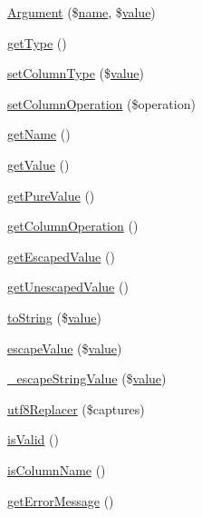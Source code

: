 \begin{DoxyCompactItemize}
\item 
\hyperlink{classArgument_aa9089313bf5ad3d10939dc1e70ee84fe}{Argument} (\$\hyperlink{common_8js_a22c29d2aa8ed6161ce8faa718ef76e68}{name}, \$\hyperlink{jquery_8js_abe5393d870043cf6aaa1d5ad5fce755c}{value})
\item 
\hyperlink{classArgument_a62ea3d6e7689c8a40f6f9722e76fa7a8}{get\+Type} ()
\item 
\hyperlink{classArgument_a849c6abe0d16f2fdf21c38db6844bd9d}{set\+Column\+Type} (\$\hyperlink{jquery_8js_abe5393d870043cf6aaa1d5ad5fce755c}{value})
\item 
\hyperlink{classArgument_a3e737e0b4af5559f56b35c7c1b1b4f2a}{set\+Column\+Operation} (\$operation)
\item 
\hyperlink{classArgument_a592176260424f46cf1b83bf2eb14014e}{get\+Name} ()
\item 
\hyperlink{classArgument_a53b70d0071096047437015737d5d7728}{get\+Value} ()
\item 
\hyperlink{classArgument_a54140067b590d8ce8dcd7d09f56519cd}{get\+Pure\+Value} ()
\item 
\hyperlink{classArgument_a8720ec6d3b4cccdb6dfdd072bb77c9d3}{get\+Column\+Operation} ()
\item 
\hyperlink{classArgument_a02ee73fa63dd2cd754412f176dae54da}{get\+Escaped\+Value} ()
\item 
\hyperlink{classArgument_a45a70c173c816e9cf2c7c5f396a92a6f}{get\+Unescaped\+Value} ()
\item 
\hyperlink{classArgument_a6fa3a8b473d05a02c7746a143e51ef81}{to\+String} (\$\hyperlink{jquery_8js_abe5393d870043cf6aaa1d5ad5fce755c}{value})
\item 
\hyperlink{classArgument_a217bae48930e0208210aa7030a2f2b27}{escape\+Value} (\$\hyperlink{jquery_8js_abe5393d870043cf6aaa1d5ad5fce755c}{value})
\item 
\hyperlink{classArgument_afd7b071db98f0a4c8ef60cdd8db8a3b2}{\+\_\+escape\+String\+Value} (\$\hyperlink{jquery_8js_abe5393d870043cf6aaa1d5ad5fce755c}{value})
\item 
\hyperlink{classArgument_aaf7f8b67195ed2e1b404339d107d6a1c}{utf8\+Replacer} (\$captures)
\item 
\hyperlink{classArgument_a3e07b6c495166e96aea4e4f90bb0fe53}{is\+Valid} ()
\item 
\hyperlink{classArgument_aced37db9a6cf1ec57e8acdea23797927}{is\+Column\+Name} ()
\item 
\hyperlink{classArgument_a6e75159f2fad478ff488bf9cff5ba139}{get\+Error\+Message} ()

\end{DoxyCompactItemize}
